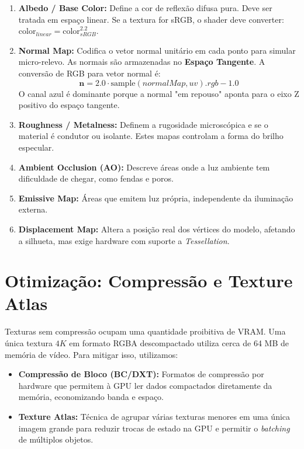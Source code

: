 \begin{enumerate}
    \item \textbf{Albedo / Base Color:} Define a cor de reflexão difusa pura. Deve ser tratada em espaço linear. Se a textura for sRGB, o shader deve converter: $\text{color}_{linear} = \text{color}_{sRGB}^{2.2}$.
    \item \textbf{Normal Map:} Codifica o vetor normal unitário em cada ponto para simular micro-relevo. As normais são armazenadas no \textbf{Espaço Tangente}. A conversão de RGB para vetor normal é:
    \[ \mathbf{n} = 2.0 \cdot \text{sample}(normalMap, uv).rgb - 1.0 \]
    O canal azul é dominante porque a normal "em repouso" aponta para o eixo Z positivo do espaço tangente.
    \item \textbf{Roughness / Metalness:} Definem a rugosidade microscópica e se o material é condutor ou isolante. Estes mapas controlam a forma do brilho especular.
    \item \textbf{Ambient Occlusion (AO):} Descreve áreas onde a luz ambiente tem dificuldade de chegar, como fendas e poros.
    \item \textbf{Emissive Map:} Áreas que emitem luz própria, independente da iluminação externa.
    \item \textbf{Displacement Map:} Altera a posição real dos vértices do modelo, afetando a silhueta, mas exige hardware com suporte a \textit{Tessellation}.
\end{enumerate}

\section{Otimização: Compressão e Texture Atlas}

Texturas sem compressão ocupam uma quantidade proibitiva de VRAM. Uma única textura $4K$ em formato RGBA descompactado utiliza cerca de 64 MB de memória de vídeo. 
Para mitigar isso, utilizamos:

\begin{itemize}
    \item \textbf{Compressão de Bloco (BC/DXT):} Formatos de compressão por hardware que permitem à GPU ler dados compactados diretamente da memória, economizando banda e espaço.
    \item \textbf{Texture Atlas:} Técnica de agrupar várias texturas menores em uma única imagem grande para reduzir trocas de estado na GPU e permitir o \textit{batching} de múltiplos objetos.
\end{itemize}

